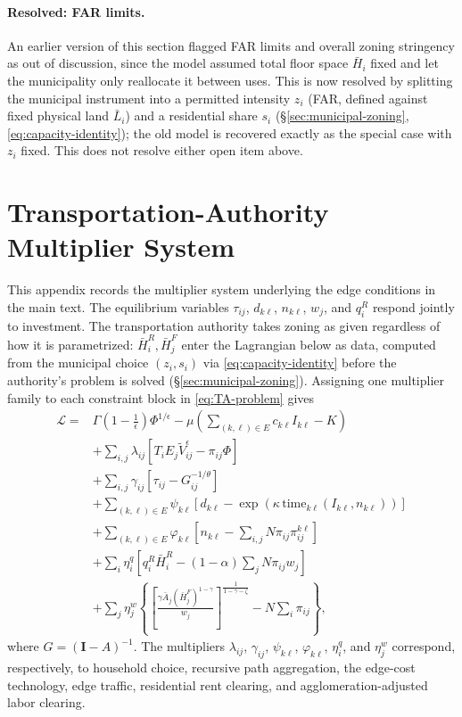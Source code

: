 \documentclass[12pt, a4paper]{article}
\theoremstyle{definition}
\theoremstyle{remark}
\begin{document}
\paragraph{Resolved: FAR limits.} An earlier version of this section flagged FAR limits and overall zoning stringency as out of discussion, since the model assumed total floor space $\bar H_i$ fixed and let the municipality only reallocate it between uses. This is now resolved by splitting the municipal instrument into a permitted intensity $z_i$ (FAR, defined against fixed physical land $\bar L_i$) and a residential share $s_i$ (\S\ref{sec:municipal-zoning}, \eqref{eq:capacity-identity}); the old model is recovered exactly as the special case with $z_i$ fixed. This does not resolve either open item above.
\appendix
\section{Transportation-Authority Multiplier System}
\label{app:ta-multipliers}

This appendix records the multiplier system underlying the edge conditions in the main text. The equilibrium variables $\tau_{ij}$, $d_{k\ell}$, $n_{k\ell}$, $w_j$, and $q_i^R$ respond jointly to investment. The transportation authority takes zoning as given regardless of how it is parametrized: $\bar H_i^R,\bar H_j^F$ enter the Lagrangian below as data, computed from the municipal choice $(z_i,s_i)$ via \eqref{eq:capacity-identity} before the authority's problem is solved (\S\ref{sec:municipal-zoning}). Assigning one multiplier family to each constraint block in \eqref{eq:TA-problem} gives
\begin{align}
    \label{eq:TA-lagrangian}
\mathcal L
={}&
\Gamma\!\left(1-\tfrac1\epsilon\right)\Phi^{1/\epsilon}
-\mu\left(\sum_{(k,\ell)\in E}c_{k\ell}I_{k\ell}-K\right)
\nonumber\\
&+
\sum_{i,j}\lambda_{ij}
\left[
T_iE_j\tilde V_{ij}^{\epsilon}-\pi_{ij}\Phi
\right]
\nonumber\\
&+
\sum_{i,j}\gamma_{ij}
\left[
\tau_{ij}-G_{ij}^{-1/\theta}
\right]
\nonumber\\
&+
\sum_{(k,\ell)\in E}\psi_{k\ell}
\left[
d_{k\ell}
-\exp\!\left(
\kappa\,\mathrm{time}_{k\ell}(I_{k\ell},n_{k\ell})
\right)
\right]
\nonumber\\
&+
\sum_{(k,\ell)\in E}\varphi_{k\ell}
\left[
n_{k\ell}
-\sum_{i,j}N\pi_{ij}\pi_{ij}^{k\ell}
\right]
\nonumber\\
&+
\sum_i\eta_i^q
\left[
q_i^R\bar H_i^R
-(1-\alpha)\sum_jN\pi_{ij}w_j
\right]
\nonumber\\
&+
\sum_j\eta_j^w
\left\{
\left[
\frac{\gamma\bar A_j(\bar H_j^F)^{1-\gamma}}{w_j}
\right]^{\!\frac{1}{1-\gamma-\zeta}}
-N\sum_i\pi_{ij}
\right\},
\end{align}
where $G=(\mathbf I-A)^{-1}$. The multipliers $\lambda_{ij}$, $\gamma_{ij}$, $\psi_{k\ell}$, $\varphi_{k\ell}$, $\eta_i^q$, and $\eta_j^w$ correspond, respectively, to household choice, recursive path aggregation, the edge-cost technology, edge traffic, residential rent clearing, and agglomeration-adjusted labor clearing.
\end{document}
